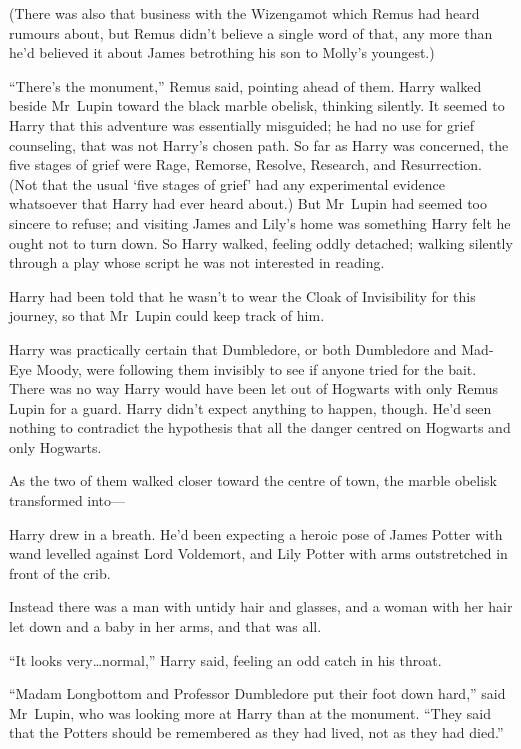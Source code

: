 (There was also that business with the Wizengamot which Remus had heard rumours
about, but Remus didn’t believe a single word of that, any more than he’d
believed it about James betrothing his son to Molly’s youngest.)

“There’s the monument,” Remus said, pointing ahead of them.
\later
Harry walked beside Mr~Lupin toward the black marble obelisk, thinking
silently. It seemed to Harry that this adventure was essentially misguided; he
had no use for grief counseling, that was not Harry’s chosen path. So far as
Harry was concerned, the five stages of grief were Rage, Remorse, Resolve,
Research, and Resurrection. (Not that the usual ‘five stages of grief’ had any
experimental evidence whatsoever that Harry had ever heard about.) But
Mr~Lupin had seemed too sincere to refuse; and visiting James and Lily’s home
was something Harry felt he ought not to turn down. So Harry walked, feeling
oddly detached; walking silently through a play whose script he was not
interested in reading.

Harry had been told that he wasn’t to wear the Cloak of Invisibility for this
journey, so that Mr~Lupin could keep track of him.

Harry was practically certain that Dumbledore, or both Dumbledore and Mad-Eye
Moody, were following them invisibly to see if anyone tried for the bait. There
was no way Harry would have been let out of Hogwarts with only Remus Lupin for
a guard. Harry didn’t expect anything to happen, though. He’d seen nothing to
contradict the hypothesis that all the danger centred on Hogwarts and only
Hogwarts.

As the two of them walked closer toward the centre of town, the marble obelisk
transformed into—

Harry drew in a breath. He’d been expecting a heroic pose of James Potter with
wand levelled against Lord Voldemort, and Lily Potter with arms outstretched in
front of the crib.

Instead there was a man with untidy hair and glasses, and a woman with her hair
let down and a baby in her arms, and that was all.

“It looks very…normal,” Harry said, feeling an odd catch in his throat.

“Madam Longbottom and Professor Dumbledore put their foot down hard,” said
Mr~Lupin, who was looking more at Harry than at the monument. “They said that
the Potters should be remembered as they had lived, not as they had died.”

